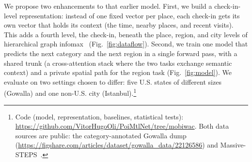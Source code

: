 We propose two enhancements to that earlier model. First, we build a check-in-level representation: instead of one fixed vector per place, each check-in gets its own vector that holds its context (the time, nearby places, and recent visits).
This adds a fourth level, the check-in, beneath the place, region, and city levels of hierarchical graph infomax~\cite{huang2023hgi,velickovic2019dgi} (Fig.~\ref{fig:dataflow}). Second, we train one model that
predicts the next category and the next region in a single forward pass, with a shared trunk (a cross-attention stack where the two tasks exchange
semantic context) and a private spatial path for the region task (Fig.~\ref{fig:model}). We evaluate on two settings chosen to differ: five U.S. states of different sizes (Gowalla) and one non-U.S. city (Istanbul).\footnote{\label{fn:code}Code (model, representation, baselines, statistical tests): \url{https://github.com/VitorHugoOli/PoiMtlNet/tree/mobiwac}. Both data sources are public: the category-annotated Gowalla dump (\url{https://figshare.com/articles/dataset/gowalla_data/22126586}) and Massive-STEPS~\cite{wongso2025massivesteps}.}

